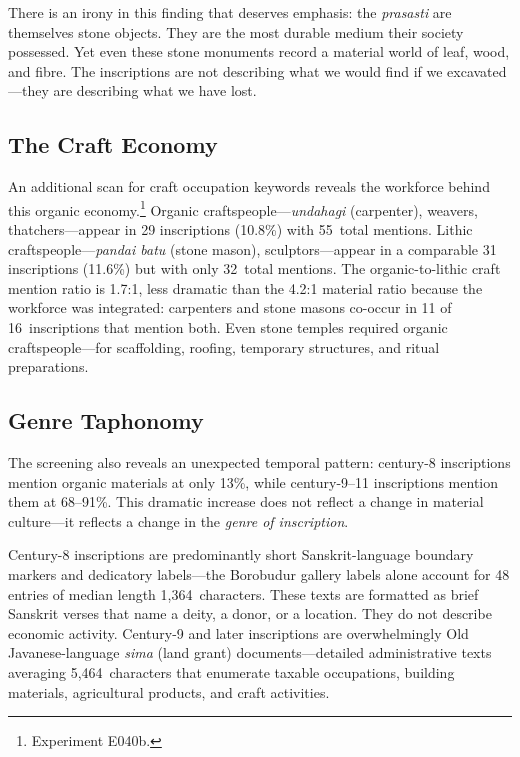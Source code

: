 \documentclass[12pt,a4paper]{article}
\begin{document}
There is an irony in this finding that deserves emphasis: the \emph{prasasti} are themselves stone objects. They are the most durable medium their society possessed. Yet even these stone monuments record a material world of leaf, wood, and fibre. The inscriptions are not describing what we would find if we excavated---they are describing what we have lost.

\subsection{The Craft Economy}

An additional scan for craft occupation keywords reveals the workforce behind this organic economy.\footnote{Experiment E040b.} Organic craftspeople---\emph{undahagi} (carpenter), weavers, thatchers---appear in 29 inscriptions (10.8\%) with 55~total mentions. Lithic craftspeople---\emph{pandai batu} (stone mason), sculptors---appear in a comparable 31 inscriptions (11.6\%) but with only 32~total mentions. The organic-to-lithic craft mention ratio is 1.7:1, less dramatic than the 4.2:1 material ratio because the workforce was integrated: carpenters and stone masons co-occur in 11 of 16~inscriptions that mention both. Even stone temples required organic craftspeople---for scaffolding, roofing, temporary structures, and ritual preparations.

\subsection{Genre Taphonomy}

The screening also reveals an unexpected temporal pattern: century-8 inscriptions mention organic materials at only 13\%, while century-9--11 inscriptions mention them at 68--91\%. This dramatic increase does not reflect a change in material culture---it reflects a change in the \emph{genre of inscription}.

Century-8 inscriptions are predominantly short Sanskrit-language boundary markers and dedicatory labels---the Borobudur gallery labels alone account for 48 entries of median length 1,364~characters. These texts are formatted as brief Sanskrit verses that name a deity, a donor, or a location. They do not describe economic activity. Century-9 and later inscriptions are overwhelmingly Old Javanese-language \emph{sima} (land grant) documents---detailed administrative texts averaging 5,464~characters that enumerate taxable occupations, building materials, agricultural products, and craft activities.
\end{document}

